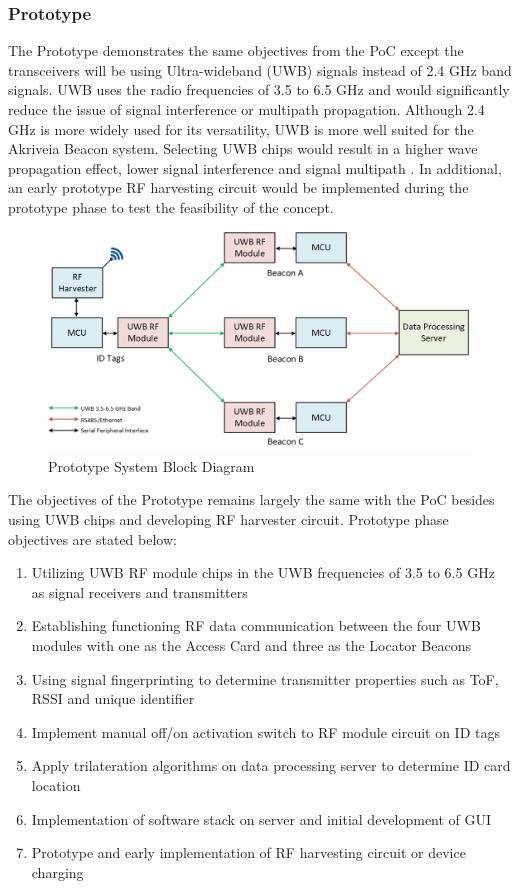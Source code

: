\break
\subsubsection{Prototype}
The Prototype demonstrates the same objectives from the PoC except the transceivers will be using Ultra-wideband (UWB) signals instead of 2.4 GHz band signals. UWB uses the radio frequencies of 3.5 to 6.5 GHz and would significantly reduce the issue of signal interference or multipath propagation. Although 2.4 GHz is more widely used for its versatility, UWB is more well suited for the Akriveia Beacon system. Selecting UWB chips would result in a higher wave propagation effect, lower signal interference and signal multipath \cite{R4}. In additional, an early prototype RF harvesting circuit would be implemented during the prototype phase to test the feasibility of the concept.

\begin{figure}[h!]
    \centering
    \includegraphics[width=\linewidth]{./images/02_sys_Prototype.png}
    \caption{Prototype System Block Diagram}
    \label{fig:prototype_sys_blk}
\end{figure}
\bigskip

The objectives of the Prototype remains largely the same with the PoC besides using UWB
chips and developing RF harvester circuit. Prototype phase objectives are stated below:

\begin{enumerate}
    \item Utilizing UWB RF module chips in the UWB frequencies of 3.5 to 6.5 GHz as
    signal receivers and transmitters
    \item Establishing functioning RF data communication between the four UWB modules
    with one as the Access Card and three as the Locator Beacons
    \item Using signal fingerprinting to determine transmitter properties such as ToF,
    RSSI and unique identifier
    \item Implement manual off/on activation switch to RF module circuit on ID tags
    \item Apply trilateration algorithms on data processing server to determine
    ID card location
    \item Implementation of software stack on server and initial development of GUI
    \item Prototype and early implementation of  RF harvesting circuit or device charging
\end{enumerate}

